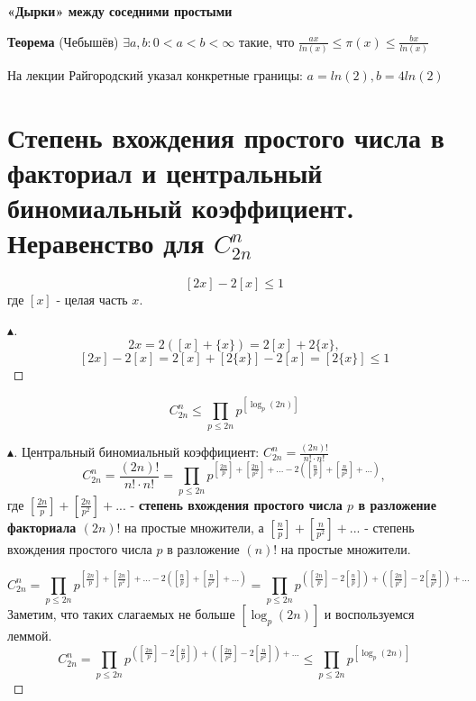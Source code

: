 \textbf{«Дырки» между соседними простыми}

\textbf{Теорема} (Чебышёв) $\exists a, b : 0 < a < b < \infty$ такие, что $\frac{ax}{ln(x)} \leq \pi(x) \leq \frac{bx}{ln(x)}$

На лекции Райгородский указал конкретные границы: $a = ln(2), b = 4 ln(2)$


\section{Степень вхождения простого числа в факториал и центральный биномиальный коэффициент. Неравенство для $C_{2n}^{n}$}
\begin{lemma}
    $$[2x] - 2[x] \leq 1$$
    где $[x]$ - целая часть $x$.
    \begin{proof}[$\blacktriangle$]
        $$2x = 2([x] + \{x\}) = 2[x] + 2\{x\}, $$
        $$[2x] - 2[x] = 2[x] + [2\{x\}] - 2[x] = [2\{x\}]  \leq 1$$
    \end{proof}
\end{lemma}
\begin{theorem}
    $$C_{2n}^n \leq \prod\limits_{p \leq 2n} p ^ {[\log_{p} (2n)]}$$
    \begin{proof}[$\blacktriangle$]
        Центральный биномиальный коэффициент: $C_{2n}^{n} = \frac{(2n)!}{n! \cdot n!}$
        $$C_{2n}^{n} = \frac{(2n)!}{n! \cdot n!} = \prod\limits_{p \leq 2n} p^{\left[ \frac{2n}{p} \right] + \left[ \frac{2n}{p^2} \right] + ... - 2 \left( \left[ \frac{n}{p} \right] + \left[ \frac{n}{p^2} \right] + ... \right) },$$
        где $\left[ \frac{2n}{p} \right] + \left[ \frac{2n}{p^2} \right] + ...$ - \textbf{степень вхождения простого числа $p$ в разложение факториала $(2n)!$} на простые множители, а $ \left[ \frac{n}{p} \right] + \left[ \frac{n}{p^2} \right] + ... $ - степень вхождения простого числа $p$ в разложение $(n)!$ на простые множители.
        
        $$C_{2n}^{n} = \prod\limits_{p \leq 2n} p^{\left[ \frac{2n}{p} \right] + \left[ \frac{2n}{p^2} \right] + ... - 2 \left( \left[ \frac{n}{p} \right] + \left[ \frac{n}{p^2} \right] + ... \right) } = \prod\limits_{p \leq 2n} p^{\left( \left[ \frac{2n}{p} \right] - 2 \left[ \frac{n}{p} \right] \right) + \left( \left[ \frac{2n}{p^2} \right] - 2 \left[ \frac{n}{p^2} \right] \right) + ...}$$
        Заметим, что таких слагаемых не больше $[\log_{p} (2n)]$ и воспользуемся леммой.
        $$C_{2n}^{n} = \prod\limits_{p \leq 2n} p^{\left( \left[ \frac{2n}{p} \right] - 2 \left[ \frac{n}{p} \right] \right) + \left( \left[ \frac{2n}{p^2} \right] - 2 \left[ \frac{n}{p^2} \right] \right) + ...} \leq \prod \limits_{p \leq 2n} p ^ { \left[ \log_{p} (2n) \right] }$$
    \end{proof}
\end{theorem}



